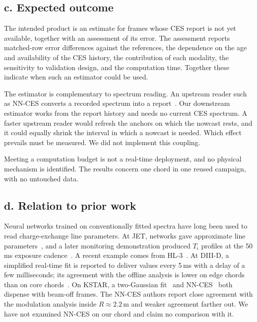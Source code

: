 \subsection*{c. Expected outcome}
The intended product is an estimate for frames whose CES report is not yet available, together with an assessment of its error. The assessment reports matched-row error differences against the references, the dependence on the age and availability of the CES history, the contribution of each modality, the sensitivity to validation design, and the computation time. Together these indicate when such an estimator could be used.

The estimator is complementary to spectrum reading. An upstream reader such as NN-CES converts a recorded spectrum into a report~\citep{Lee2026NeuralNetworkbased}. Our downstream estimator works from the report history and needs no current CES spectrum. A faster upstream reader would refresh the anchors on which the nowcast rests, and it could equally shrink the interval in which a nowcast is needed. Which effect prevails must be measured. We did not implement this coupling.

Meeting a computation budget is not a real-time deployment, and no physical mechanism is identified. The results concern one chord in one reused campaign, with no untouched data.

\subsection*{d. Relation to prior work}
Neural networks trained on conventionally fitted spectra have long been used to read charge-exchange line parameters. At JET, networks gave approximate line parameters~\citep{Bishop1993AutomaticAnalysis}, and a later monitoring demonstration produced $T_i$ profiles at the 50\,ms exposure cadence~\citep{Svensson1999AnalysisJet}. A recent example comes from HL-3~\citep{Tian2026RealTimeCxrs}. At DIII-D, a simplified real-time fit is reported to deliver values every 5\,ms with a delay of a few milliseconds; its agreement with the offline analysis is lower on edge chords than on core chords~\citep{Chrystal2026RealTime}. On KSTAR, a two-Gaussian fit~\citep{Lee2020TwoGaussian} and NN-CES~\citep{Lee2026NeuralNetworkbased} both dispense with beam-off frames. The NN-CES authors report close agreement with the modulation analysis inside $R\approx2.2$\,m and weaker agreement farther out. We have not examined NN-CES on our chord and claim no comparison with it.

